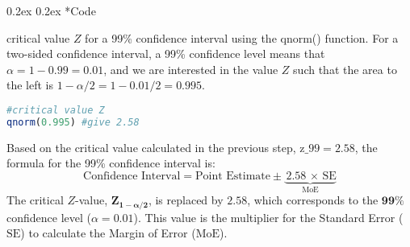 \documentclass[8pt,landscape]{article}
\makeatletter
\renewcommand{\subsection}{\@startsection{subsection}{2}{0pt}%
    {0.2ex}%
    {0.2ex}%
    {\fontsize{8}{8}\bfseries\color{blue}}} %
\newcommand{\smalltext}[1]{%
  {\fontsize{8}{7}\selectfont\sloppy #1\par}%
}
\makeatother
\begin{document}
\pagestyle{empty}
\begin{multicols}{3}
\subsection*{Code}
\smalltext{critical value $Z$ for a 99\% confidence interval using the qnorm() function. For a two-sided confidence interval, a 99\% confidence level means that $\alpha = 1 - 0.99 = 0.01$, and we are interested in the value $Z$ such that the area to the left is $1 - \alpha/2 = 1 - 0.01/2 = 0.995$.}
\begin{lstlisting}[language=R]
#critical value Z
qnorm(0.995) #give 2.58
\end{lstlisting}

\smalltext{
    Based on the critical value calculated in the previous step, $\text{z\_99} = 2.58$, the formula for the 99\% confidence interval is:$$\text{Confidence Interval} = \text{Point Estimate} \pm \underbrace{\, 2.58 \, \times \, \text{SE}}_{\text{MoE}}$$The critical $Z$-value, $\mathbf{Z_{1 - \alpha/2}}$, is replaced by $\mathbf{2.58}$, which corresponds to the $\mathbf{99\%}$ confidence level ($\alpha = 0.01$). This value is the multiplier for the Standard Error ($\text{SE}$) to calculate the Margin of Error ($\text{MoE}$).
}

\end{multicols}
\end{document}
